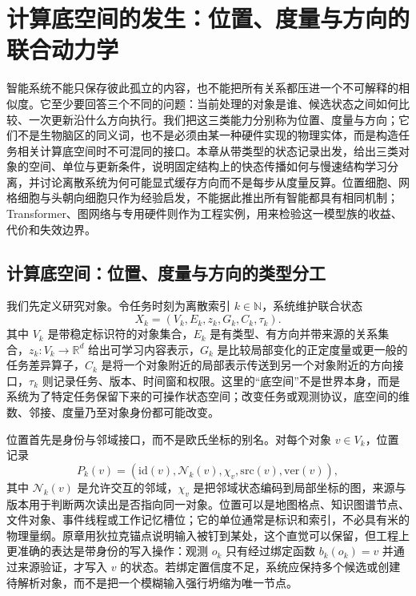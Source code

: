 \chapter{计算底空间的发生：位置、度量与方向的联合动力学}
\label{chp:manifold_genesis_trinity_evolution}

智能系统不能只保存彼此孤立的内容，也不能把所有关系都压进一个不可解释的相似度。它至少要回答三个不同的问题：当前处理的对象是谁、候选状态之间如何比较、一次更新沿什么方向执行。我们把这三类能力分别称为位置、度量与方向；它们不是生物脑区的同义词，也不是必须由某一种硬件实现的物理实体，而是构造任务相关计算底空间时不可混同的接口。本章从带类型的状态记录出发，给出三类对象的空间、单位与更新条件，说明固定结构上的快态传播如何与慢速结构学习分离，并讨论离散系统为何可能显式缓存方向而不是每步从度量反算。位置细胞、网格细胞与头朝向细胞只作为经验启发，不能据此推出所有智能都具有相同机制；Transformer、图网络与专用硬件则作为工程实例，用来检验这一模型族的收益、代价和失效边界。

\section{计算底空间：位置、度量与方向的类型分工}
\label{sec:ontological_foundation_trinity}

我们先定义研究对象。令任务时刻为离散索引 $k\in\mathbb{N}$，系统维护联合状态
\[
X_k=(V_k,E_k,z_k,G_k,C_k,\tau_k).
\]
其中 $V_k$ 是带稳定标识符的对象集合，$E_k$ 是有类型、有方向并带来源的关系集合，$z_k:V_k\rightarrow\mathbb{R}^{d}$ 给出可学习内容表示，$G_k$ 是比较局部变化的正定度量或更一般的任务差异算子，$C_k$ 是将一个对象附近的局部表示传送到另一个对象附近的方向接口，$\tau_k$ 则记录任务、版本、时间窗和权限。这里的“底空间”不是世界本身，而是系统为了特定任务保留下来的可操作状态空间；改变任务或观测协议，底空间的维数、邻接、度量乃至对象身份都可能改变。

位置首先是身份与邻域接口，而不是欧氏坐标的别名。对每个对象 $v\in V_k$，位置记录
\[
P_k(v)=(\mathrm{id}(v),\mathcal{N}_k(v),\chi_v,\mathrm{src}(v),\mathrm{ver}(v)),
\]
其中 $\mathcal{N}_k(v)$ 是允许交互的邻域，$\chi_v$ 是把邻域状态编码到局部坐标的图，来源与版本用于判断两次读出是否指向同一对象。位置可以是地图格点、知识图谱节点、文件对象、事件线程或工作记忆槽位；它的单位通常是标识和索引，不必具有米的物理量纲。原章用狄拉克锚点说明输入被钉到某处，这个直觉可以保留，但工程上更准确的表达是带身份的写入操作：观测 $o_k$ 只有经过绑定函数 $b_k(o_k)=v$ 并通过来源验证，才写入 $v$ 的状态。若绑定置信度不足，系统应保持多个候选或创建待解析对象，而不是把一个模糊输入强行坍缩为唯一节点。

